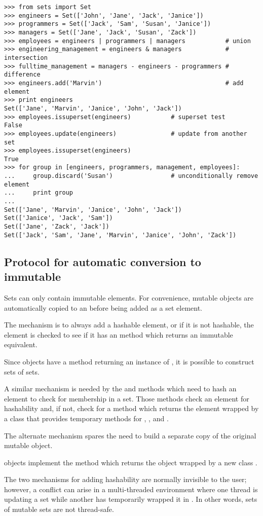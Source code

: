 \begin{verbatim}
>>> from sets import Set
>>> engineers = Set(['John', 'Jane', 'Jack', 'Janice'])
>>> programmers = Set(['Jack', 'Sam', 'Susan', 'Janice'])
>>> managers = Set(['Jane', 'Jack', 'Susan', 'Zack'])
>>> employees = engineers | programmers | managers           # union
>>> engineering_management = engineers & managers            # intersection
>>> fulltime_management = managers - engineers - programmers # difference
>>> engineers.add('Marvin')                                  # add element
>>> print engineers
Set(['Jane', 'Marvin', 'Janice', 'John', 'Jack'])
>>> employees.issuperset(engineers)           # superset test
False
>>> employees.update(engineers)               # update from another set
>>> employees.issuperset(engineers)
True
>>> for group in [engineers, programmers, management, employees]:
...     group.discard('Susan')                # unconditionally remove element
...     print group
...
Set(['Jane', 'Marvin', 'Janice', 'John', 'Jack'])
Set(['Janice', 'Jack', 'Sam'])
Set(['Jane', 'Zack', 'Jack'])
Set(['Jack', 'Sam', 'Jane', 'Marvin', 'Janice', 'John', 'Zack'])
\end{verbatim}


\subsection{Protocol for automatic conversion to immutable
            \label{immutable-transforms}}

Sets can only contain immutable elements.  For convenience, mutable
 objects are automatically copied to an 
before being added as a set element.

The mechanism is to always add a hashable element, or if it is not
hashable, the element is checked to see if it has an
 method which returns an immutable equivalent.

Since  objects have a  method
returning an instance of , it is possible to
construct sets of sets.

A similar mechanism is needed by the  and
 methods which need to hash an element to check
for membership in a set.  Those methods check an element for hashability
and, if not, check for a  method
which returns the element wrapped by a class that provides temporary
methods for , , and .

The alternate mechanism spares the need to build a separate copy of
the original mutable object.

 objects implement the 
method which returns the  object wrapped by a new class
.

The two mechanisms for adding hashability are normally invisible to the
user; however, a conflict can arise in a multi-threaded environment
where one thread is updating a set while another has temporarily wrapped it
in .  In other words, sets of mutable sets
are not thread-safe.
